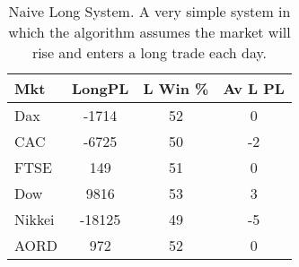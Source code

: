 \begin{table}[ht]
\centering
\caption[Results from the Naive Long System]{Naive Long System. A very simple system in which the algorithm assumes the market will rise and enters a long trade each day.} 
\label{tab:nlng_results}
\begin{tabular}{lccc}
  \toprule Mkt & LongPL & L Win \% & Av L PL \\ 
  \midrule Dax & -1714 & 52 & 0 \\ 
  CAC & -6725 & 50 & -2 \\ 
  FTSE & 149 & 51 & 0 \\ 
  Dow & 9816 & 53 & 3 \\ 
  Nikkei & -18125 & 49 & -5 \\ 
  AORD & 972 & 52 & 0 \\ 
   \bottomrule \end{tabular}
\end{table}
